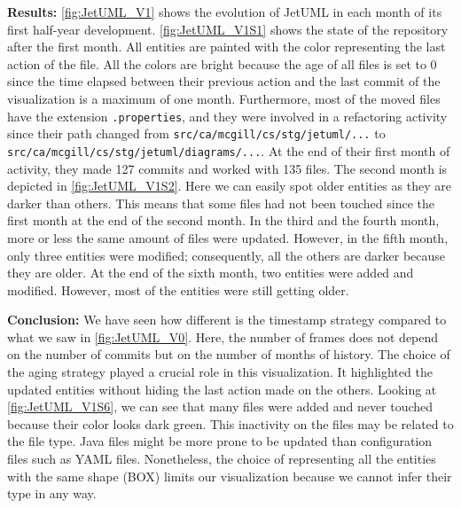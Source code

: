 \bigbreak
\noindent
\textbf{Results:}
\autoref{fig:JetUML_V1} shows the evolution of JetUML in each month of its first half-year development. \autoref{fig:JetUML_V1S1} shows the state of the repository after the first month. All entities are painted with the color representing the last action of the file. All the colors are bright because the age of all files is set to 0 since the time elapsed between their previous action and the last commit of the visualization is a maximum of one month. Furthermore, most of the moved files have the extension \texttt{.properties}, and they were involved in a refactoring activity since their path changed from \texttt{src/ca/mcgill/cs/stg/jetuml/...} to \texttt{src/ca/mcgill/cs/stg/jetuml/diagrams/...}.  At the end of their first month of activity, they made 127 commits and worked with 135 files. The second month is depicted in \autoref{fig:JetUML_V1S2}. Here we can easily spot older entities as they are darker than others. This means that some files had not been touched since the first month at the end of the second month. In the third and the fourth month, more or less the same amount of files were updated. However, in the fifth month, only three entities were modified; consequently, all the others are darker because they are older. 
At the end of the sixth month, two entities were added and modified. However, most of the entities were still getting older. 

\bigbreak
\noindent
\textbf{Conclusion:}
We have seen how different is the timestamp strategy compared to what we saw in \autoref{fig:JetUML_V0}. Here, the number of frames does not depend on the number of commits but on the number of months of history. 
The choice of the aging strategy played a crucial role in this visualization. It highlighted the updated entities without hiding the last action made on the others. Looking at \autoref{fig:JetUML_V1S6}, we can see that many files were added and never touched because their color looks dark green. This inactivity on the files may be related to the file type. Java files might be more prone to be updated than configuration files such as YAML files. Nonetheless, the choice of representing all the entities with the same shape (BOX) limits our visualization because we cannot infer their type in any way. 


